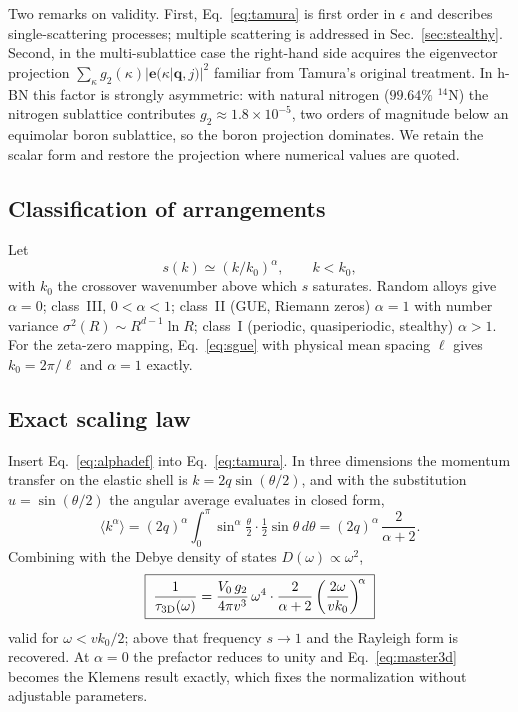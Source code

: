 \documentclass[
  aps,
  prl,
  reprint,
  amsmath,
  amssymb,
  superscriptaddress,
  floatfix,
  nofootinbib
]{revtex4-2}
\newcommand{\kzero}{k_{0}}
\begin{document}
Two remarks on validity. First, Eq.~\eqref{eq:tamura} is first order in
$\epsilon$ and describes single-scattering processes; multiple scattering is
addressed in Sec.~\ref{sec:stealthy}. Second, in the multi-sublattice case the
right-hand side acquires the eigenvector projection
$\sum_\kappa g_2(\kappa)|\bm e(\kappa|\bm q,j)|^{2}$ familiar from Tamura's
original treatment. In h-BN this factor is strongly asymmetric: with natural
nitrogen ($99.64\%$ $^{14}$N) the nitrogen sublattice contributes
$g_2\approx1.8\times10^{-5}$, two orders of magnitude below an equimolar boron
sublattice, so the boron projection dominates. We retain the scalar form and
restore the projection where numerical values are quoted.

\subsection{Classification of arrangements}

Let
\begin{equation}
  s(k)\simeq(k/\kzero)^{\alpha},\qquad k<\kzero,
  \label{eq:alphadef}
\end{equation}
with $\kzero$ the crossover wavenumber above which $s$ saturates. Random
alloys give $\alpha=0$; class~III, $0<\alpha<1$; class~II (GUE, Riemann zeros)
$\alpha=1$ with number variance $\sigma^{2}(R)\sim R^{d-1}\ln R$; class~I
(periodic, quasiperiodic, stealthy) $\alpha>1$. For the zeta-zero mapping,
Eq.~\eqref{eq:sgue} with physical mean spacing $\ell$ gives $\kzero=2\pi/\ell$
and $\alpha=1$ exactly.

\subsection{Exact scaling law}
\label{sec:scaling}

Insert Eq.~\eqref{eq:alphadef} into Eq.~\eqref{eq:tamura}. In three dimensions
the momentum transfer on the elastic shell is $k=2q\sin(\theta/2)$, and with
the substitution $u=\sin(\theta/2)$ the angular average evaluates in closed
form,
\begin{equation}
  \big\langle k^{\alpha}\big\rangle
    = (2q)^{\alpha}\!\!\int_0^{\pi}\!\!\sin^{\alpha}\!\tfrac{\theta}{2}
      \cdot\tfrac{1}{2}\sin\theta\,d\theta
    = (2q)^{\alpha}\,\frac{2}{\alpha+2}.
  \label{eq:angavg}
\end{equation}
Combining with the Debye density of states $D(\omega)\propto\omega^{2}$,
\begin{equation}
  \boxed{\;
  \frac{1}{\tau_{\rm 3D}(\omega)}
    = \frac{V_0\,g_2}{4\pi v^{3}}\,\omega^{4}\cdot\frac{2}{\alpha+2}
      \left(\frac{2\omega}{v\kzero}\right)^{\!\alpha}\;}
  \label{eq:master3d}
\end{equation}
valid for $\omega<v\kzero/2$; above that frequency $s\to1$ and the Rayleigh
form is recovered. At $\alpha=0$ the prefactor reduces to unity and
Eq.~\eqref{eq:master3d} becomes the Klemens result exactly, which fixes the
normalization without adjustable parameters.
\end{document}
